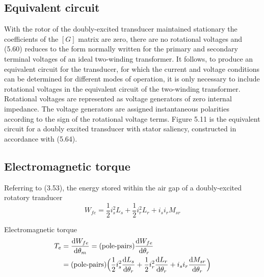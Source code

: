 \documentclass[a4paper,numbers=noenddot,12pt]{scrbook}
\begin{document}
            \subsection{Equivalent circuit}
            With the rotor of the doubly-excited transducer maintained stationary the coefficients of the $[G]$ matrix are zero, there are no rotational voltages and (5.60) reduces to the form normally written for the primary and secondary terminal voltages of an ideal two-winding transformer. It follows, to produce an equivalent circuit for the transducer, for which the current and voltage conditions can be determined for different modes of operation, it is only necessary to include rotational voltages in the equivalent circuit of the two-winding transformer. Rotational voltages are represented as voltage generators of zero internal impedance. The voltage generators are assigned instantaneous polarities according to the sign of the rotational voltage terms.
            Figure 5.11 is the equivalent circuit for a doubly excited transducer with stator saliency, constructed in accordance with (5.64).
            \subsection{Electromagnetic torque}
            Referring to (3.53), the energy stored within the air gap of a doubly-excited rotatory tranducer
            \begin{equation*}
                W_{fe} = \frac{1}{2} i_s^2 L_s + \frac{1}{2} i_r^2 L_r + i_s i_r M_{sr}
            \end{equation*}

            Electromagnetic torque
            \begin{align}
                T_e & = \frac{\dif W_{fe}}{\dif \theta_m} = (\text{pole-pairs}) \frac{\dif W_{fe}}{\dif \theta_r} \nonumber \\
                & = (\text{pole-pairs})\Big( \frac{1}{2}i_s^2 \frac{\dif L_s}{\dif \theta_r} + \frac{1}{2}i_r^2 \frac{\dif L_r}{\dif \theta_r}  +i_s i_r \frac{\dif M_{sr}}{\dif \theta_r}  \Big)
            \end{align}
\end{document}
